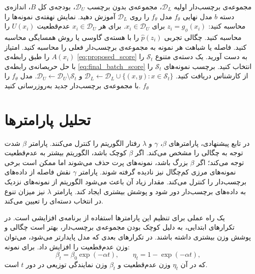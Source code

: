\documentclass[12pt,a4paper,oneside]{report}
\newcommand{\cD}{\mathcal{D}}
\newcommand{\cS}{\mathcal{S}}
\begin{document}
\begin{algorithm}[H]
\caption{یادگیری فعال مبتنی بر توزیع}
\label{alg:distribution_active_learning}
\begin{algorithmic}[1]
\Require مجموعه‌ی برچسب‌دار اولیه $\cD_L$، مجموعه‌ی بدون برچسب $\cD_U$، بودجه‌ی کل $B$، اندازه‌ی دسته $b$
\Ensure مدل نهایی $f_\theta$
\State مدل $f_\theta$ را روی $\cD_L$ آموزش دهید.
    \State نمایش نهفته‌ی نمونه‌ها را محاسبه کنید: $z_i=g_\phi(x_i)$ برای $x_i\in\cD_U$.
    \State برای هر $x_i\in\cD_U$ عدم‌قطعیت $U(x_i)$ را محاسبه کنید.
    \State چگالی تجربی $\widehat p(z_i)$ را با هسته‌ی گاوسی یا روش همسایگی محاسبه کنید.
    \State فاصله یا شباهت هر نمونه به مجموعه‌ی برچسب‌دار فعلی را محاسبه کنید.
    \State امتیاز $A(x_i)$ را طبق رابطه‌ی \eqref{eq:proposed_score} به دست آورید.
    \State یک دسته‌ی متنوع $\cS_t$ را با حل حریصانه‌ی رابطه‌ی \eqref{eq:final_batch_score} انتخاب کنید.
    \State برچسب نمونه‌های $\cS_t$ را از کارشناس دریافت کنید.
    \State $\cD_L\leftarrow \cD_L\cup\{(x,y):x\in\cS_t\}$ و $\cD_U\leftarrow\cD_U\setminus\cS_t$.
    \State مدل $f_\theta$ را با مجموعه‌ی برچسب‌دار جدید به‌روزرسانی کنید.
\EndFor
\State \Return $f_\theta$
\end{algorithmic}
\end{algorithm}

\section{تحلیل پارامترها}
\label{sec:dal_parameters}

در تابع پیشنهادی، پارامترهای $\beta$، $\gamma$ و $\lambda$ رفتار الگوریتم را کنترل می‌کنند. پارامتر $\beta$ شدت توجه به چگالی را مشخص می‌کند. اگر $\beta$ کوچک باشد، الگوریتم بیشتر به عدم‌قطعیت توجه می‌کند؛ اگر $\beta$ بزرگ باشد، نمونه‌های پرت حذف می‌شوند اما ممکن است برخی نمونه‌های مرزی کم‌چگال نیز نادیده گرفته شوند. پارامتر $\gamma$ نقش فاصله از داده‌های برچسب‌دار را کنترل می‌کند. مقدار زیاد آن باعث می‌شود الگوریتم از نمونه‌های نزدیک به داده‌های برچسب‌دار دور شود و پوشش بیشتری ایجاد کند. پارامتر $\lambda$ نیز میزان تنوع در انتخاب دسته‌ای را تعیین می‌کند.

یک راه عملی برای تنظیم این پارامترها استفاده از برنامه‌ی افزایشی است. در تکرارهای ابتدایی، به دلیل کوچک بودن مجموعه‌ی برچسب‌دار، بهتر است چگالی و پوشش وزن بیشتری داشته باشند. در تکرارهای بعدی که مدل پایدارتر می‌شود، می‌توان وزن عدم‌قطعیت را افزایش داد. برای نمونه:
\begin{equation}
\beta_t=\beta_0\exp(-\alpha t),
\qquad
\eta_t=1-\exp(-\alpha t),
\end{equation}
که در آن $\eta_t$ وزن عدم‌قطعیت و $\beta_t$ وزن نمایندگی توزیعی در دور $t$ است.
\end{document}
